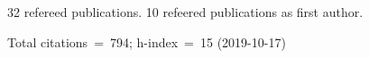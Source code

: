 32 refereed publications. 10 refeered publications as first author.

Total citations~=~794; h-index~=~15 (2019-10-17)
